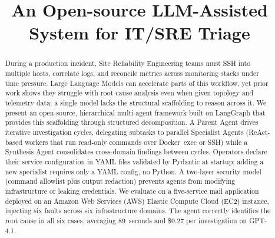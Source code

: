 \documentclass[conference]{IEEEtran}
\begin{document}
\title{An Open-source LLM-Assisted System for IT/SRE Triage }

\makeatletter
\newcommand{\linebreakand}{%
  \end{@IEEEauthorhalign}
  \hfill\mbox{}\par
  \mbox{}\hfill\begin{@IEEEauthorhalign}
}
\makeatother



\author{
\and
{}
\and
{}
}


\maketitle
\begin{abstract}
During a production incident, Site Reliability Engineering teams
must SSH into multiple hosts, correlate logs, and reconcile metrics
across monitoring stacks under time pressure. Large Language Models
can accelerate parts of this workflow, yet prior work shows they
struggle with root cause analysis even when given topology and
telemetry data; a single model lacks the structural scaffolding to
reason across it. We present an open-source, hierarchical
multi-agent framework built on LangGraph that provides this
scaffolding through structured decomposition. A Parent Agent drives
iterative investigation cycles, delegating subtasks to parallel
Specialist Agents (ReAct-based workers that run read-only commands
over Docker~exec or SSH) while a Synthesis Agent consolidates
cross-domain findings between cycles. Operators declare their
service configuration in YAML files validated by Pydantic at
startup; adding a new specialist requires only a YAML config, no
Python. A two-layer security model (command allowlist plus output
redaction) prevents agents from modifying infrastructure or leaking
credentials. We evaluate on a five-service mail application
deployed on an Amazon Web Services (AWS) Elastic Compute Cloud (EC2)
instance, injecting six faults across six infrastructure domains.
The agent correctly identifies the root cause in all six cases,
averaging 89~seconds and \$0.27 per investigation on GPT-4.1.
\end{abstract}
\end{document}
